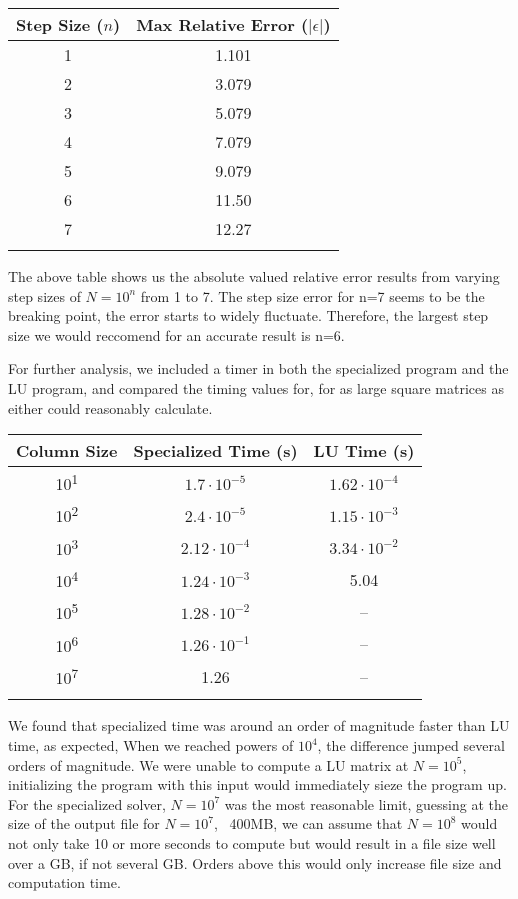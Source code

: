 \documentclass[10pt,showpacs,preprintnumbers,footinbib,amsmath,amssymb,aps,prl,twocolumn,groupedaddress,superscriptaddress,showkeys]{revtex4-1}
\begin{document}
\begin{center}
	\begin{tabular}{cc}
		\hline \hline
			Step Size ($n$) &  Max Relative Error ($|\epsilon|$)\\
			\hline
			1 & 1.101\\
			2 & 3.079\\
			3 & 5.079\\
			4 & 7.079\\
			5 & 9.079\\
			6 & 11.50\\
			7 & 12.27\\
			\hline
			\label{errortable}
	\end{tabular}
\end{center}
	
	The above table shows us the absolute valued relative error results from varying step sizes of $N=10^{n}$ from 1 to 7. The step size error for n=7 seems to be the breaking point, the error starts to widely fluctuate. Therefore, the largest step size we would reccomend for an accurate result is n=6.  


	For further analysis, we included a timer in both the specialized program and the LU program, and compared the timing values for, for as large square matrices as either could reasonably calculate.

	\begin{center}
		\begin{tabular}{ccc}
			\hline \hline
			Column Size & Specialized Time (s) & LU Time (s)\\
			\hline		
			10\textsuperscript{1} & $1.7 \cdot 10^{-5}$      & $1.62 \cdot 10^{-4}$  \\
			10\textsuperscript{2} & $2.4 \cdot 10^{-5}$      &  $1.15 \cdot 10^{-3}$ \\
			10\textsuperscript{3} & $2.12 \cdot 10^{-4}$    &  $3.34 \cdot 10^{-2}$  \\
			10\textsuperscript{4} & $1.24 \cdot 10^{-3}$    &   5.04\\
			10\textsuperscript{5} & $1.28 \cdot 10^{-2}$    & --\\
			10\textsuperscript{6} & $1.26 \cdot 10^{-1}$    & --\\
			10\textsuperscript{7} & 1.26                               & --\\
			\hline
			\label{timingtable}
		\end{tabular}
	\end{center}
	We found that specialized time was around an order of magnitude faster than LU time, as expected, When we reached powers of $10^{4}$, the difference jumped several orders of magnitude. We were unable to compute a LU matrix at $N=10^{5}$, initializing the program with this input would immediately sieze the program up. For the specialized solver, $N=10^{7}$ was the most reasonable limit, guessing at the size of the output file for $N=10^{7}$, ~400MB, we can assume that $N=10^{8}$ would not only take 10 or more seconds to compute but would result in a file size well over a GB, if not several GB. Orders above this would only increase  file size and computation time. \\
\end{document}
